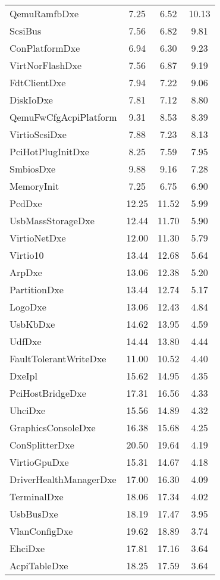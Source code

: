 \begin{longtable}{l c c c}
  QemuRamfbDxe & 7.25 & 6.52 & 10.13\\
  ScsiBus & 7.56 & 6.82 & 9.81\\
  ConPlatformDxe & 6.94 & 6.30 & 9.23\\
  VirtNorFlashDxe & 7.56 & 6.87 & 9.19\\
  FdtClientDxe & 7.94 & 7.22 & 9.06\\
  DiskIoDxe & 7.81 & 7.12 & 8.80\\
  QemuFwCfgAcpiPlatform & 9.31 & 8.53 & 8.39\\
  VirtioScsiDxe & 7.88 & 7.23 & 8.13\\
  PciHotPlugInitDxe & 8.25 & 7.59 & 7.95\\
  SmbiosDxe & 9.88 & 9.16 & 7.28\\
  MemoryInit & 7.25 & 6.75 & 6.90\\
  PcdDxe & 12.25 & 11.52 & 5.99\\
  UsbMassStorageDxe & 12.44 & 11.70 & 5.90\\
  VirtioNetDxe & 12.00 & 11.30 & 5.79\\
  Virtio10 & 13.44 & 12.68 & 5.64\\
  ArpDxe & 13.06 & 12.38 & 5.20\\
  PartitionDxe & 13.44 & 12.74 & 5.17\\
  LogoDxe & 13.06 & 12.43 & 4.84\\
  UsbKbDxe & 14.62 & 13.95 & 4.59\\
  UdfDxe & 14.44 & 13.80 & 4.44\\
  FaultTolerantWriteDxe & 11.00 & 10.52 & 4.40\\
  DxeIpl & 15.62 & 14.95 & 4.35\\
  PciHostBridgeDxe & 17.31 & 16.56 & 4.33\\
  UhciDxe & 15.56 & 14.89 & 4.32\\
  GraphicsConsoleDxe & 16.38 & 15.68 & 4.25\\
  ConSplitterDxe & 20.50 & 19.64 & 4.19\\
  VirtioGpuDxe & 15.31 & 14.67 & 4.18\\
  DriverHealthManagerDxe & 17.00 & 16.30 & 4.09\\
  TerminalDxe & 18.06 & 17.34 & 4.02\\
  UsbBusDxe & 18.19 & 17.47 & 3.95\\
  VlanConfigDxe & 19.62 & 18.89 & 3.74\\
  EhciDxe & 17.81 & 17.16 & 3.64\\
  AcpiTableDxe & 18.25 & 17.59 & 3.64\\

\end{longtable}
